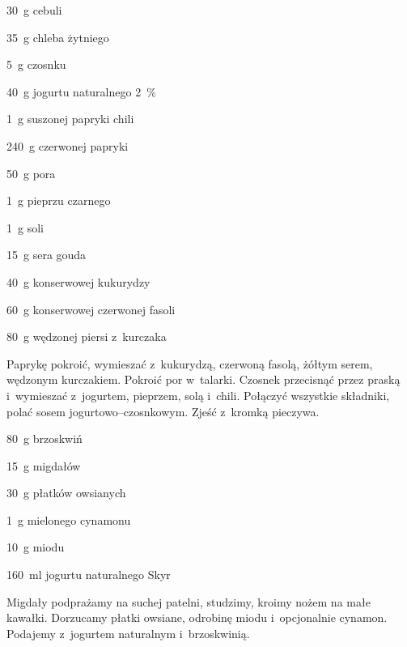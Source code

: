 \documentclass[../kucharek.tex]{subfiles}
\begin{document}
\begin{Ingred}
    \item \qty{30}{\gram} cebuli
    \item \qty{35}{\gram} chleba żytniego
    \item \qty{5}{\gram} czosnku
    \item \qty{40}{\gram} jogurtu naturalnego \qty{2}{\percent}
    \item \qty{1}{\gram} suszonej papryki chili
    \item \qty{240}{\gram} czerwonej papryki
    \item \qty{50}{\gram} pora
    \item \qty{1}{\gram} pieprzu czarnego
    \item \qty{1}{\gram} soli
    \item \qty{15}{\gram} sera gouda
    \item \qty{40}{\gram} konserwowej kukurydzy
    \item \qty{60}{\gram} konserwowej czerwonej fasoli
    \item \qty{80}{\gram} wędzonej piersi z~kurczaka
\end{Ingred}

Paprykę pokroić, wymieszać z~kukurydzą, czerwoną fasolą, żółtym serem, wędzonym
kurczakiem. Pokroić por w~talarki. Czosnek przecisnąć przez praską i~wymieszać
z~jogurtem, pieprzem, solą i~chili. Połączyć wszystkie składniki, polać sosem
jogurtowo--czosnkowym. Zjeść z~kromką pieczywa.


\begin{Ingred}
    \item \qty{80}{\gram} brzoskwiń
    \item \qty{15}{\gram} migdałów
    \item \qty{30}{\gram} płatków owsianych
    \item \qty{1}{\gram} mielonego cynamonu
    \item \qty{10}{\gram} miodu
    \item \qty{160}{\milli\litre} jogurtu naturalnego Skyr
\end{Ingred}

Migdały podprażamy na suchej patelni, studzimy, kroimy nożem na małe kawałki.
Dorzucamy płatki owsiane, odrobinę miodu i~opcjonalnie cynamon. Podajemy
z~jogurtem naturalnym i~brzoskwinią.

\end{document}
